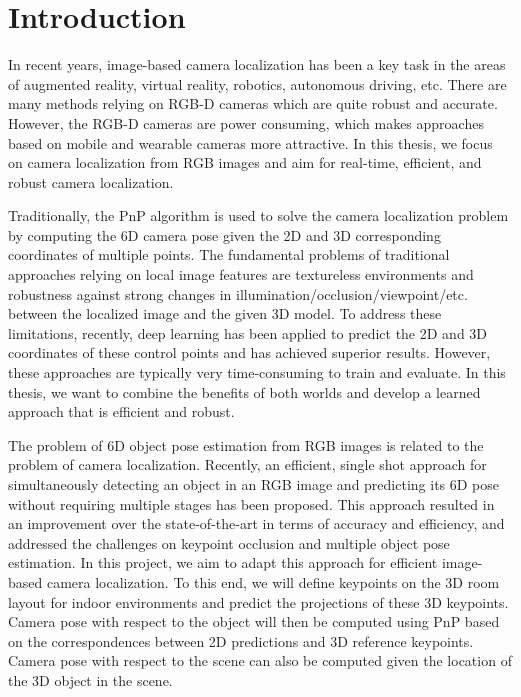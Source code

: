 \chapter{Introduction}

In recent years, image-based camera localization has been a key task in the areas of augmented reality, virtual reality, robotics, autonomous driving, etc. There are many methods relying on RGB-D cameras which are quite robust and accurate. However, the RGB-D cameras are power consuming, which makes approaches based on mobile and wearable cameras more attractive. In this thesis, we focus on camera localization from RGB images and aim for real-time, efficient, and robust camera localization.

Traditionally, the PnP \cite{lepetit2009epnp} algorithm is used to solve the camera localization problem by computing the 6D camera pose given the 2D and 3D corresponding coordinates of multiple points. The fundamental problems of traditional approaches relying on local image features are textureless environments and robustness against strong changes in illumination/occlusion/viewpoint/etc. between the localized image and the given 3D model. To address these limitations, recently, deep learning has been applied to predict the 2D and 3D coordinates of these control points \cite{brachmann2017dsac} and has achieved superior results. However, these approaches are typically very time-consuming to train and evaluate. In this thesis, we want to combine the benefits of both worlds and develop a learned approach that is efficient and robust.

The problem of 6D object pose estimation from RGB images is related to the problem of camera localization. Recently, an efficient, single shot approach \cite{tekin2018real} for simultaneously detecting an object in an RGB image and predicting its 6D pose without requiring multiple stages has been proposed. This approach resulted in an improvement over the state-of-the-art in terms of accuracy and efficiency, and addressed the challenges on keypoint occlusion and multiple object pose estimation. In this project, we aim to adapt this approach for efficient image-based camera localization. To this end, we will define keypoints on the 3D room layout for indoor environments and predict the projections of these 3D keypoints. Camera pose with respect to the object will then be computed using PnP \cite{lepetit2009epnp} based on the correspondences between 2D predictions and 3D reference keypoints. Camera pose with respect to the scene can also be computed given the location of the 3D object in the scene.

